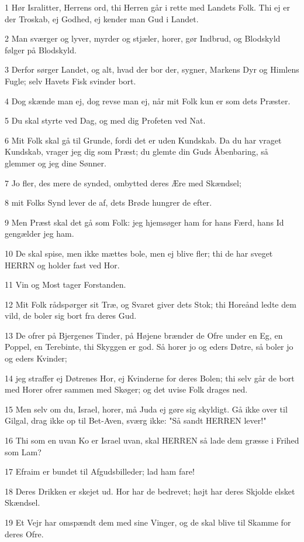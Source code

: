 \par 1 Hør Isralitter, Herrens ord, thi Herren går i rette med Landets Folk. Thi ej er der Troskab, ej Godhed, ej kender man Gud i Landet.
\par 2 Man sværger og lyver, myrder og stjæler, horer, gør Indbrud, og Blodskyld følger på Blodskyld.
\par 3 Derfor sørger Landet, og alt, hvad der bor der, sygner, Markens Dyr og Himlens Fugle; selv Havets Fisk svinder bort.
\par 4 Dog skænde man ej, dog revse man ej, når mit Folk kun er som dets Præster.
\par 5 Du skal styrte ved Dag, og med dig Profeten ved Nat.
\par 6 Mit Folk skal gå til Grunde, fordi det er uden Kundskab. Da du har vraget Kundskab, vrager jeg dig som Præst; du glemte din Guds Åbenbaring, så glemmer og jeg dine Sønner.
\par 7 Jo fler, des mere de synded, ombytted deres Ære med Skændsel;
\par 8 mit Folks Synd lever de af, dets Brøde hungrer de efter.
\par 9 Men Præst skal det gå som Folk: jeg hjemsøger ham for hans Færd, hans Id gengælder jeg ham.
\par 10 De skal spise, men ikke mættes bole, men ej blive fler; thi de har sveget HERRN og holder fast ved Hor.
\par 11 Vin og Most tager Forstanden.
\par 12 Mit Folk rådspørger sit Træ, og Svaret giver dets Stok; thi Horeånd ledte dem vild, de boler sig bort fra deres Gud.
\par 13 De ofrer på Bjergenes Tinder, på Højene brænder de Ofre under en Eg, en Poppel, en Terebinte, thi Skyggen er god. Så horer jo og eders Døtre, så boler jo og eders Kvinder;
\par 14 jeg straffer ej Døtrenes Hor, ej Kvinderne for deres Bolen; thi selv går de bort med Horer ofrer sammen med Skøger; og det uvise Folk drages ned.
\par 15 Men selv om du, Israel, horer, må Juda ej gøre sig skyldigt. Gå ikke over til Gilgal, drag ikke op til Bet-Aven, sværg ikke: "Så sandt HERREN lever!"
\par 16 Thi som en uvan Ko er Israel uvan, skal HERREN så lade dem græsse i Frihed som Lam?
\par 17 Efraim er bundet til Afgudsbilleder; lad ham fare!
\par 18 Deres Drikken er skejet ud. Hor har de bedrevet; højt har deres Skjolde elsket Skændsel.
\par 19 Et Vejr har omspændt dem med sine Vinger, og de skal blive til Skamme for deres Ofre.

